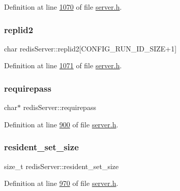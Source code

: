 Definition at line \hyperlink{server_8h_source_l01070}{1070} of file \hyperlink{server_8h_source}{server.\+h}.

\mbox{\label{structredisServer_af90c075e99f67ac11dff1b7058e7633c}} 
\subsubsection{\texorpdfstring{replid2}{replid2}}
{\footnotesize\ttfamily char redis\+Server\+::replid2\mbox{[}C\+O\+N\+F\+I\+G\+\_\+\+R\+U\+N\+\_\+\+I\+D\+\_\+\+S\+I\+ZE+1\mbox{]}}



Definition at line \hyperlink{server_8h_source_l01071}{1071} of file \hyperlink{server_8h_source}{server.\+h}.

\mbox{\label{structredisServer_adb369f58bfb6e901d70e00c5a83a4bfe}} 
\subsubsection{\texorpdfstring{requirepass}{requirepass}}
{\footnotesize\ttfamily char$\ast$ redis\+Server\+::requirepass}



Definition at line \hyperlink{server_8h_source_l00900}{900} of file \hyperlink{server_8h_source}{server.\+h}.

\mbox{\label{structredisServer_a3064f7e62f8210ee69afd48d9c9cc6da}} 
\subsubsection{\texorpdfstring{resident\+\_\+set\+\_\+size}{resident\_set\_size}}
{\footnotesize\ttfamily size\+\_\+t redis\+Server\+::resident\+\_\+set\+\_\+size}



Definition at line \hyperlink{server_8h_source_l00970}{970} of file \hyperlink{server_8h_source}{server.\+h}.

